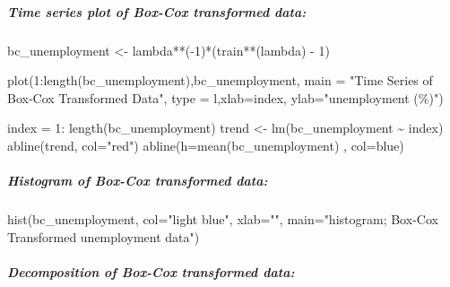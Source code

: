 \documentclass[
  letterpaper,
  DIV=11,
  numbers=noendperiod]{scrartcl}
\let\oldsubparagraph\subparagraph
\renewcommand{\subparagraph}[1]{\oldsubparagraph{#1}\mbox{}}
\newenvironment{Shaded}{\begin{snugshade}}{\end{snugshade}}
\newcommand{\AttributeTok}[1]{\textcolor[rgb]{0.40,0.45,0.13}{#1}}
\newcommand{\DecValTok}[1]{\textcolor[rgb]{0.68,0.00,0.00}{#1}}
\newcommand{\FunctionTok}[1]{\textcolor[rgb]{0.28,0.35,0.67}{#1}}
\newcommand{\NormalTok}[1]{\textcolor[rgb]{0.00,0.23,0.31}{#1}}
\newcommand{\OtherTok}[1]{\textcolor[rgb]{0.00,0.23,0.31}{#1}}
\newcommand{\SpecialCharTok}[1]{\textcolor[rgb]{0.37,0.37,0.37}{#1}}
\newcommand{\StringTok}[1]{\textcolor[rgb]{0.13,0.47,0.30}{#1}}
\begin{document}
\hypertarget{time-series-plot-of-box-cox-transformed-data}{%
\subparagraph{Time series plot of Box-Cox transformed
data:}\label{time-series-plot-of-box-cox-transformed-data}}

\begin{Shaded}
\begin{Highlighting}[]
\NormalTok{bc\_unemployment }\OtherTok{\textless{}{-}}\NormalTok{ lambda}\SpecialCharTok{**}\NormalTok{(}\SpecialCharTok{{-}}\DecValTok{1}\NormalTok{)}\SpecialCharTok{*}\NormalTok{(train}\SpecialCharTok{**}\NormalTok{(lambda) }\SpecialCharTok{{-}} \DecValTok{1}\NormalTok{)}

\FunctionTok{plot}\NormalTok{(}\DecValTok{1}\SpecialCharTok{:}\FunctionTok{length}\NormalTok{(bc\_unemployment),bc\_unemployment, }\AttributeTok{main =} \StringTok{"Time Series of Box{-}Cox Transformed Data"}\NormalTok{, }\AttributeTok{type =} \StringTok{\textquotesingle{}l\textquotesingle{}}\NormalTok{,}\AttributeTok{xlab=}\StringTok{\textquotesingle{}index\textquotesingle{}}\NormalTok{, }\AttributeTok{ylab=}\StringTok{"unemployment (\%)"}\NormalTok{)}

\NormalTok{index }\OtherTok{=} \DecValTok{1}\SpecialCharTok{:} \FunctionTok{length}\NormalTok{(bc\_unemployment)}
\NormalTok{trend }\OtherTok{\textless{}{-}} \FunctionTok{lm}\NormalTok{(bc\_unemployment }\SpecialCharTok{\textasciitilde{}}\NormalTok{ index)}
\FunctionTok{abline}\NormalTok{(trend, }\AttributeTok{col=}\StringTok{"red"}\NormalTok{)}
\FunctionTok{abline}\NormalTok{(}\AttributeTok{h=}\FunctionTok{mean}\NormalTok{(bc\_unemployment) , }\AttributeTok{col=}\StringTok{\textquotesingle{}blue\textquotesingle{}}\NormalTok{)}
\end{Highlighting}
\end{Shaded}

\hypertarget{histogram-of-box-cox-transformed-data}{%
\subparagraph{Histogram of Box-Cox transformed
data:}\label{histogram-of-box-cox-transformed-data}}

\begin{Shaded}
\begin{Highlighting}[]
\FunctionTok{hist}\NormalTok{(bc\_unemployment, }\AttributeTok{col=}\StringTok{"light blue"}\NormalTok{, }\AttributeTok{xlab=}\StringTok{""}\NormalTok{, }\AttributeTok{main=}\StringTok{"histogram; Box{-}Cox Transformed unemployment data"}\NormalTok{)}
\end{Highlighting}
\end{Shaded}

\hypertarget{decomposition-of-box-cox-transformed-data}{%
\subparagraph{Decomposition of Box-Cox transformed
data:}\label{decomposition-of-box-cox-transformed-data}}
\end{document}
